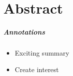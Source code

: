 \chapter{Abstract}
\label{abstract}

\paragraph{Annotations}

\begin{itemize}
	\item Exciting summary
	\item Create interest 
\end{itemize}